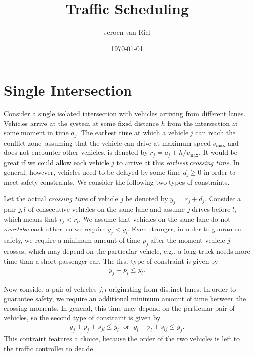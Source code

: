 \documentclass{article}
\title{Traffic Scheduling}
\author{Jeroen van Riel}
\date{\monthyeardate\today}
\theoremstyle{definition}
\theoremstyle{plain}
\begin{document}
\maketitle

\section{Single Intersection}

Consider a single isolated intersection with vehicles arriving from different
lanes. Vehicles arrive at the system at some fixed distance $h$ from the
intersection at some moment in time $a_{j}$. The earliest time at which a
vehicle $j$ can reach the conflict zone, assuming that the vehicle can drive at
maximum speed $v_{\text{max}}$ and does not encounter other vehicles, is denoted
by $r_{j} = a_{j} + h / v_{\text{max}}$. It would be great if we could allow each
vehicle $j$ to arrive at this \textit{earliest crossing time}. In general,
however, vehicles need to be delayed by some time $d_{j} \geq 0$ in order to
meet safety constraints. We consider the following two types of
constraints.

Let the actual \textit{crossing time} of vehicle $j$ be denoted by
$y_{j} = r_{j} + d_{j}$. Consider a pair $j,l$ of consecutive vehicles on the
same lane and assume $j$ drives before $l$, which means that $r_{j} < r_{l}$. We
assume that vehicles on the same lane do not \textit{overtake} each other, so we
require $y_{j} < y_{l}$. Even stronger, in order to guarantee safety, we require
a minimum amount of time $p_{j}$ after the moment vehicle $j$ crosses, which may
depend on the particular vehicle, e.g., a long truck needs more time than a
short passenger car. The first type of constraint is given by
\begin{align}
  \label{eq:traffic-constr-1}
  y_{j} + p_{j} \leq y_{l} .
\end{align}

Now consider a pair of vehicles $j,l$ originating from distinct lanes. In order
to guarantee safety, we require an additional minimum amount of time between the
crossing moments. In general, this time may depend on the particular pair of
vehicles, so the second type of constraint is given by
\begin{align}
  \label{eq:traffic-constr-2}
  y_{j} + p_{j} + s_{jl} \leq y_{l} \; \text{ or } \; y_{l} + p_{l} + s_{lj} \leq y_{j} .
\end{align}
This contraint features a choice, because the order of the two vehicles is left
to the traffic controller to decide.
\end{document}
